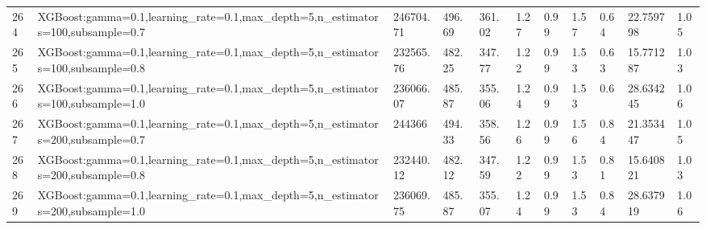 \begin{longtable}{C{0.8cm} L{2cm} C{1.15cm} C{1.15cm} C{1.15cm} C{1.15cm} C{0.85cm} C{1.25cm} C{1.2cm} C{1.5cm} C{1.0cm}}
264 & XGBoost:\newline gamma=0.1,\newline learning\_rate=0.1,\newline max\_depth=5,\newline n\_estimators=100,\newline subsample=0.7 & 246704.71 & 496.69 & 361.02 & 1.27 & 0.99 & 1.57 & 0.64 & 22.759798 & 1.05 \\
265 & XGBoost:\newline gamma=0.1,\newline learning\_rate=0.1,\newline max\_depth=5,\newline n\_estimators=100,\newline subsample=0.8 & 232565.76 & 482.25 & 347.77 & 1.22 & 0.99 & 1.53 & 0.63 & 15.771287 & 1.03 \\
266 & XGBoost:\newline gamma=0.1,\newline learning\_rate=0.1,\newline max\_depth=5,\newline n\_estimators=100,\newline subsample=1.0 & 236066.07 & 485.87 & 355.06 & 1.24 & 0.99 & 1.53 & 0.6 & 28.634245 & 1.06 \\
267 & XGBoost:\newline gamma=0.1,\newline learning\_rate=0.1,\newline max\_depth=5,\newline n\_estimators=200,\newline subsample=0.7 & 244366 & 494.33 & 358.56 & 1.26 & 0.99 & 1.56 & 0.84 & 21.353447 & 1.05 \\
268 & XGBoost:\newline gamma=0.1,\newline learning\_rate=0.1,\newline max\_depth=5,\newline n\_estimators=200,\newline subsample=0.8 & 232440.12 & 482.12 & 347.59 & 1.22 & 0.99 & 1.53 & 0.81 & 15.640821 & 1.03 \\
269 & XGBoost:\newline gamma=0.1,\newline learning\_rate=0.1,\newline max\_depth=5,\newline n\_estimators=200,\newline subsample=1.0 & 236069.75 & 485.87 & 355.07 & 1.24 & 0.99 & 1.53 & 0.84 & 28.637919 & 1.06 \\

\end{longtable}
